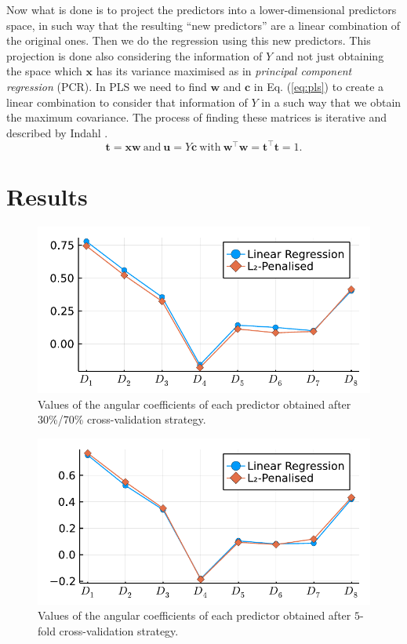 \documentclass[conference]{IEEEtran}
\begin{document}
Now what is done is to project the predictors into a lower-dimensional predictors space, in such way that the resulting ``new predictors'' are a linear combination of the original ones. Then we do the regression using this new predictors. This projection is done also considering the information of $Y$ and not just obtaining the space which $\mathbf{x}$ has its variance maximised as in \emph{principal component regression} (PCR). In PLS we need to find $\mathbf{w}$ and $\mathbf{c}$ in Eq. (\ref{eq:pls}) to create a linear combination to consider that information of $Y$ in a such way that we obtain the maximum covariance. The process of finding these matrices is iterative and described by Indahl \cite{b8}.
%
\begin{equation}
\mathbf{t} = \mathbf{x}\mathbf{w}\ \text{and}\ \mathbf{u}=Y\mathbf{c}\ \text{with}\ \textbf{w}^\top\textbf{w}=\textbf{t}^\top\textbf{t}=1.
\label{eq:pls}
\end{equation}

\section{Results}

\begin{figure}[htbp]
\centerline{\includegraphics[width=\columnwidth]{../figures/fitted_params_70}}
\caption{Values of the angular coefficients of each predictor obtained after 30\%/70\% cross-validation strategy.}
\end{figure}

\begin{figure}[htbp]
\centerline{\includegraphics[width=\columnwidth]{../figures/fitted_params_kfolds}}
\caption{Values of the angular coefficients of each predictor obtained after $5$-fold cross-validation strategy.}%
\end{figure}
\end{document}
